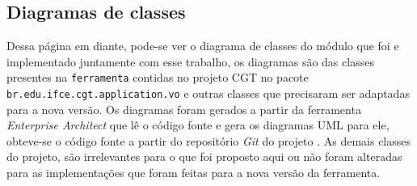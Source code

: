 \documentclass[12pt,oneside,openright,a4paper,english,brazil,sumario=tradicional]{abntex2}
\begin{document}
\begin{anexosenv}
   \chapter{Diagramas de classes}
   \label{chap:diagramas}
   Dessa página em diante, pode-se ver o diagrama de classes do módulo que foi e implementado juntamente com esse trabalho, os diagramas são das classes presentes na \texttt{ferramenta} contidas no projeto CGT no pacote \texttt{br.edu.ifce.cgt.application.vo} e outras classes que precisaram ser adaptadas para a nova versão. Os diagramas foram gerados a partir da ferramenta \textit{Enterprise Architect} que lê o código fonte e gera os diagramas UML para ele, obteve-se o código fonte a partir do repositório \textit{Git} do projeto \cite{website:projeto-cgt-repo}.
   As demais classes do projeto, são irrelevantes para o que foi proposto aqui ou não foram alteradas para as implementações que foram feitas para a nova versão da ferramenta.

   
\end{anexosenv}
\printindex
\end{document}
